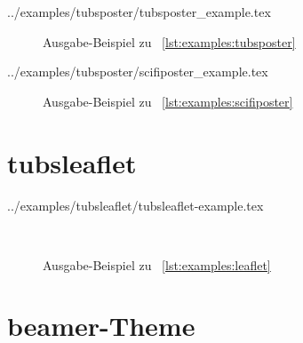 {  %
    {../examples/tubsposter/tubsposter_example.tex}


  \begin{figure}[!ht]\centering
    \caption{Ausgabe-Beispiel zu \lstlistingname~\ref{lst:examples:tubsposter}}
    \label{fig:examples:tubsposter}
  \end{figure}
  
    {../examples/tubsposter/scifiposter_example.tex}

  \begin{figure}[!ht]\centering
    \caption{Ausgabe-Beispiel zu \lstlistingname~\ref{lst:examples:scifiposter}}
    \label{fig:examples:tubsposter}
  \end{figure}

\clearpage
\section{tubsleaflet}

    {../examples/tubsleaflet/tubsleaflet-example.tex}
  
    \begin{figure}
    \begin{minipage}{\textwidth}\centering
    \end{minipage}\\[1ex]
    \begin{minipage}{\textwidth}\centering
    \end{minipage}
    \caption{Ausgabe-Beispiel zu \lstlistingname~\ref{lst:examples:leaflet}}
    \label{fig:examples:tubsposter}
  \end{figure}

\clearpage
\section{beamer-Theme}

}

